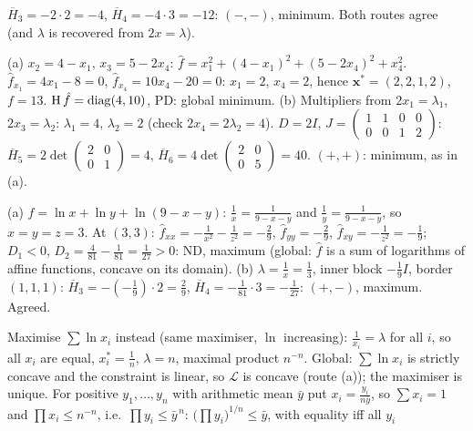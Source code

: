 \begin{solutions}
        $\overline{H}_3=-2\cdot2=-4$, $\overline{H}_4=-4\cdot3=-12$:
        $(-,-)$, minimum. Both routes agree (and $\lambda$ is recovered from
        $2x=\lambda$).
  \item (a) $x_2=4-x_1$, $x_3=5-2x_4$:
        $\hat f=x_1^{2}+(4-x_1)^{2}+(5-2x_4)^{2}+x_4^{2}$.
        $\hat f_{x_1}=4x_1-8=0$, $\hat f_{x_4}=10x_4-20=0$: $x_1=2$,
        $x_4=2$, hence $\mathbf{x}^*=(2,2,1,2)$, $f=13$.
        $\operatorname{H}\hat f=\operatorname{diag}(4,10)$, PD: global minimum.
        (b) Multipliers from $2x_1=\lambda_1$, $2x_3=\lambda_2$:
        $\lambda_1=4$, $\lambda_2=2$ (check $2x_4=2\lambda_2=4$). $D=2I$,
        $J=\begin{pmatrix}1&1&0&0\\0&0&1&2\end{pmatrix}$:
        $\overline{H}_5=2\det\begin{pmatrix}2&0\\0&1\end{pmatrix}=4$,
        $\overline{H}_6=4\det\begin{pmatrix}2&0\\0&5\end{pmatrix}=40$.
        $(+,+)$: minimum, as in (a).
  \item (a) $\hat f=\ln x+\ln y+\ln(9-x-y)$: $\tfrac1x=\tfrac1{9-x-y}$ and
        $\tfrac1y=\tfrac1{9-x-y}$, so $x=y=z=3$. At $(3,3)$:
        $\hat f_{xx}=-\tfrac1{x^{2}}-\tfrac1{z^{2}}=-\tfrac29$,
        $\hat f_{yy}=-\tfrac29$, $\hat f_{xy}=-\tfrac1{z^{2}}=-\tfrac19$;
        $D_1<0$, $D_2=\tfrac4{81}-\tfrac1{81}=\tfrac1{27}>0$: ND, maximum
        (global: $\hat f$ is a sum of logarithms of affine functions,
        concave on its domain). (b) $\lambda=\tfrac1x=\tfrac13$, inner block
        $-\tfrac19I$, border $(1,1,1)$: $\overline{H}_3=-(-\tfrac19)\cdot2
        =\tfrac29$, $\overline{H}_4=-\tfrac1{81}\cdot3=-\tfrac1{27}$:
        $(+,-)$, maximum. Agreed.
  \item Maximise $\sum\ln x_i$ instead (same maximiser, $\ln$ increasing):
        $\tfrac1{x_i}=\lambda$ for all $i$, so all $x_i$ are equal,
        $x_i^*=\tfrac1n$, $\lambda=n$, maximal product $n^{-n}$. Global:
        $\sum\ln x_i$ is strictly concave and the constraint is linear, so
        $\mathcal{L}$ is concave (route (a)); the maximiser is unique. For
        positive $y_1,\dots,y_n$ with arithmetic mean $\bar y$ put
        $x_i=\tfrac{y_i}{n\bar y}$, so $\sum x_i=1$ and
        $\prod x_i\le n^{-n}$, i.e.\ $\prod y_i\le\bar y^{\,n}$:
        $\bigl(\prod y_i\bigr)^{1/n}\le\bar y$, with equality iff all $y_i$

\end{solutions}
